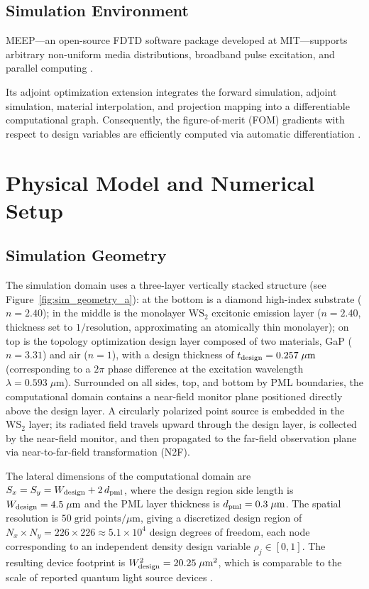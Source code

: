 \subsection{Simulation Environment}

MEEP—an open-source FDTD software package developed at MIT—supports arbitrary non-uniform media distributions, broadband pulse excitation, and parallel computing \cite{Oskooi2009meep}.

Its adjoint optimization extension integrates the forward simulation, adjoint simulation, material interpolation, and projection mapping into a differentiable computational graph. Consequently, the figure-of-merit (FOM) gradients with respect to design variables are efficiently computed via automatic differentiation \cite{Hammond2022high}.


\section{Physical Model and Numerical Setup}

\subsection{Simulation Geometry}

The simulation domain uses a three-layer vertically stacked structure (see Figure~\ref{fig:sim_geometry_a}): at the bottom is a diamond high-index substrate ($n = 2.40$); in the middle is the monolayer $\text{WS}_2$ excitonic emission layer ($n = 2.40$, thickness set to $1/\text{resolution}$, approximating an atomically thin monolayer); on top is the topology optimization design layer composed of two materials, GaP ($n = 3.31$) and air ($n = 1$), with a design thickness of $t_{\rm design} = 0.257\;\mu\text{m}$ (corresponding to a $2\pi$ phase difference at the excitation wavelength $\lambda = 0.593\;\mu\text{m}$). Surrounded on all sides, top, and bottom by PML boundaries, the computational domain contains a near-field monitor plane positioned directly above the design layer. A circularly polarized point source is embedded in the $\text{WS}_2$ layer; its radiated field travels upward through the design layer, is collected by the near-field monitor, and then propagated to the far-field observation plane via near-to-far-field transformation (N2F).

The lateral dimensions of the computational domain are $S_x = S_y = W_{\rm design} + 2\,d_{\rm pml}$, where the design region side length is $W_{\rm design} = 4.5\;\mu\text{m}$ and the PML layer thickness is $d_{\rm pml} = 0.3\;\mu\text{m}$. The spatial resolution is $50\;\text{grid points}/\mu\text{m}$, giving a discretized design region of $N_x \times N_y = 226 \times 226 \approx 5.1\times10^4$ design degrees of freedom, each node corresponding to an independent density design variable $\rho_j \in [0,1]$. The resulting device footprint is $W_{\rm design}^2 = 20.25\;\mu\text{m}^2$, which is comparable to the scale of reported quantum light source devices \cite{chakravarthi2020inverse}.

